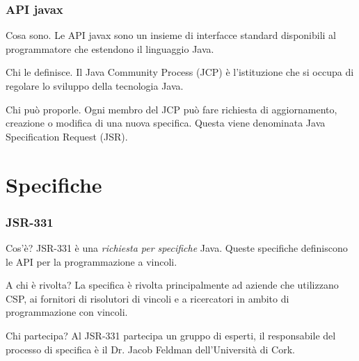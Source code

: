 \documentclass{beamer}
\begin{document}
\begin{frame}
\frametitle{API javax}
\begin{block}{Cosa sono.}
Le API javax sono un insieme di interfacce standard disponibili al
programmatore che estendono il linguaggio Java.
\end{block}
\pause
\begin{block}{Chi le definisce.}
Il Java Community Process (JCP) è l'istituzione che si occupa di regolare lo
sviluppo della tecnologia Java.
\end{block}
\pause
\begin{block}{Chi può proporle.}
Ogni membro del JCP può fare richiesta di aggiornamento, creazione o modifica
di una nuova specifica. Questa viene denominata Java Specification Request
(JSR).
\end{block}
\end{frame}

\section{Specifiche}

\begin{frame}
\frametitle{JSR-331}
\begin{block}{Cos'è?}
JSR-331 è una \emph{richiesta per specifiche} Java.
Queste specifiche definiscono le API per la programmazione a vincoli.
\end{block}
\pause
\begin{block}{A chi è rivolta?}
La specifica è rivolta principalmente ad aziende che utilizzano CSP, ai
fornitori di
risolutori di vincoli e a ricercatori in ambito di programmazione con vincoli.
\end{block}
\pause
\begin{block}{Chi partecipa?}
Al JSR-331 partecipa un gruppo di esperti, il responsabile del processo
di specifica è il Dr. Jacob Feldman dell'Università di Cork.
\end{block}
\end{frame}
\end{document}
